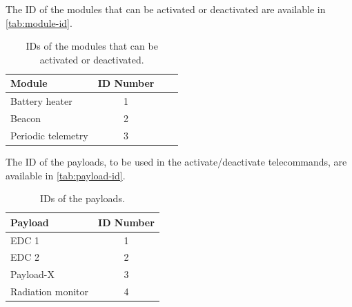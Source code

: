The ID of the modules that can be activated or deactivated are available in \autoref{tab:module-id}.

\begin{table}[ht]
    \centering
    \begin{tabular}{lcL{0.53\textwidth}c}
        \toprule[1.5pt]
        \textbf{Module} & \textbf{ID Number} \\
        \midrule
        Battery heater      & 1 \\
        Beacon              & 2 \\
        Periodic telemetry  & 3 \\
        \bottomrule[1.5pt]
    \end{tabular}
    \caption{IDs of the modules that can be activated or deactivated.}
    \label{tab:module-id}
\end{table}

The ID of the payloads, to be used in the activate/deactivate telecommands, are available in \autoref{tab:payload-id}.

\begin{table}[ht]
    \centering
    \begin{tabular}{lc}
        \toprule[1.5pt]
        \textbf{Payload} & \textbf{ID Number} \\
        \midrule
        EDC 1               & 1 \\
        EDC 2               & 2 \\
        Payload-X           & 3 \\
        Radiation monitor   & 4 \\
        \bottomrule[1.5pt]
    \end{tabular}
    \caption{IDs of the payloads.}
    \label{tab:payload-id}
\end{table}

